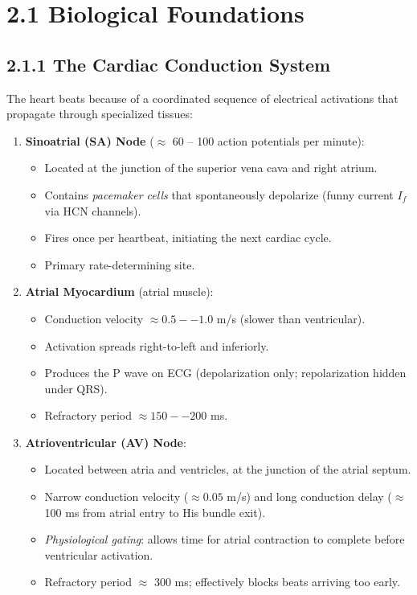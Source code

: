 \documentclass[12pt,oneside,a4paper]{book}
\begin{document}
\section{2.1 Biological Foundations}

\subsection{2.1.1 The Cardiac Conduction System}

The heart beats because of a coordinated sequence of electrical activations that propagate through specialized tissues:

\begin{enumerate}
  \item \textbf{Sinoatrial (SA) Node} ($\approx$ 60 -- 100 action potentials per minute):
    \begin{itemize}
      \item Located at the junction of the superior vena cava and right atrium.
      \item Contains \emph{pacemaker cells} that spontaneously depolarize (funny current $I_f$ via HCN channels).
      \item Fires once per heartbeat, initiating the next cardiac cycle.
      \item Primary rate-determining site.
    \end{itemize}

  \item \textbf{Atrial Myocardium} (atrial muscle):
    \begin{itemize}
      \item Conduction velocity $\approx 0.5 -- 1.0$ m/s (slower than ventricular).
      \item Activation spreads right-to-left and inferiorly.
      \item Produces the P wave on ECG (depolarization only; repolarization hidden under QRS).
      \item Refractory period $\approx 150 -- 200$ ms.
    \end{itemize}

  \item \textbf{Atrioventricular (AV) Node}:
    \begin{itemize}
      \item Located between atria and ventricles, at the junction of the atrial septum.
      \item Narrow conduction velocity ($\approx 0.05$ m/s) and long conduction delay ($\approx$ 100 ms from atrial entry to His bundle exit).
      \item \emph{Physiological gating}: allows time for atrial contraction to complete before ventricular activation.
      \item Refractory period $\approx$ 300 ms; effectively blocks beats arriving too early.
    \end{itemize}


\end{enumerate}
\end{document}
